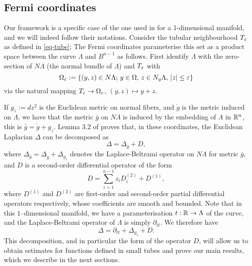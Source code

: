 
\subsection{Fermi coordinates}
\label{sec:fermi}

Our framework is a specific case of the one used in \cite{Pacard2014} for a
1-dimensional manifold, and we will indeed follow their notations. Consider the
tubular neighbourhood $T_\varepsilon$ as defined in \ref{eq-tube}; The Fermi coordinates
parameterise this set as a product space between the curve $\Lambda$ and
$B^{n-1}$ as follows. First identify $\Lambda$ with the zero-section of
$N\Lambda$ (the normal bundle of $\Lambda$) and $T_\varepsilon$ with
$$
\Omega_\varepsilon:=\{(y,z)\in N\Lambda;\, y\in\Omega,\, z\in N_y\Lambda,\, |z|\leq\varepsilon\}
$$
via the natural mapping $T_\varepsilon\to\Omega_\varepsilon$, $(y,z)\mapsto y+z$.

If $g_z:=dz^2$ is the Euclidean metric on normal fibers, and $\mathring{g}$ is
the metric induced on $\Lambda$, we have that the metric $\bar g$ on $N\Lambda$
is induced by the embedding of $\Lambda$ in $\mathbb{R}^n$, this is $\bar g=\mathring
g+g_z$. Lemma 3.2 of \cite{Pacard2014} proves that, in these coordinates, the
Euclidean Laplacian $\Delta$ can be decomposed as
\begin{equation}
\Delta = \Delta_{\bar g} + D,
\end{equation}
where $\Delta_{\bar g}=\Delta_{\mathring g}+\Delta_{g_z}$ denotes the
Laplace-Beltrami operator on $N\Lambda$ for metric $\bar g$, and $D$ is a
second-order differential operator of the form
\begin{equation}
D = \sum_{i=1}^{n-1} z_iD_i^{(2)}+D^{(1)},
\end{equation}
where $D^{(1)}$ and $D^{(2)}$ are first-order and second-order partial
differential operators respectively, whose
coefficients are smooth and bounded.
Note that in this $1$--dimensional manifold, we have a parameterisation
$t:\mathbb{R}\to\Lambda$ of the curve, and the Laplace-Beltrami operator of $\Lambda$
is simply $\partial_{tt}$. We therefore have
\begin{equation}
    \Delta = \partial_{tt}+\Delta_{g_z}+D.
\end{equation}
This decomposition, and in particular the form of the operator $D$, will allow
us to obtain estimates for functions defined in small tubes and prove our main
results, which we describe in the next sections.
